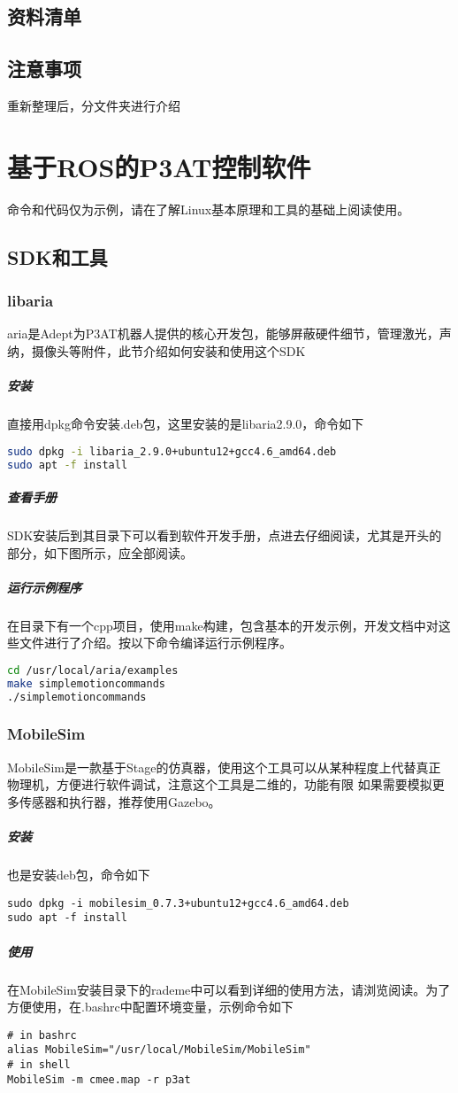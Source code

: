 \documentclass[a4paper,twoside,cs4size,fancyhdr,notitlepage]{ctexart}
\begin{document}
\subsection{资料清单}
\subsection{注意事项}
重新整理后，分文件夹进行介绍
\section{基于ROS的P3AT控制软件}
命令和代码仅为示例，请在了解Linux基本原理和工具的基础上阅读使用。
\lstset{
    language=bash %
}
\subsection{SDK和工具}
\subsubsection{libaria}
aria是Adept为P3AT机器人提供的核心开发包，能够屏蔽硬件细节，管理激光，声纳，摄像头等附件，此节介绍如何安装和使用这个SDK
\subparagraph{安装}
直接用dpkg命令安装.deb包，这里安装的是libaria2.9.0，命令如下
\begin{lstlisting}[language=bash]
sudo dpkg -i libaria_2.9.0+ubuntu12+gcc4.6_amd64.deb
sudo apt -f install
\end{lstlisting}
\subparagraph{查看手册}
SDK安装后到其目录下可以看到软件开发手册，点进去仔细阅读，尤其是开头的部分，如下图所示，应全部阅读。
\subparagraph{运行示例程序}
在目录下有一个cpp项目，使用make构建，包含基本的开发示例，开发文档中对这些文件进行了介绍。按以下命令编译运行示例程序。
\begin{lstlisting}[language=bash]
cd /usr/local/aria/examples
make simplemotioncommands
./simplemotioncommands
\end{lstlisting}
\subsubsection{MobileSim}
MobileSim是一款基于Stage的仿真器，使用这个工具可以从某种程度上代替真正物理机，方便进行软件调试，注意这个工具是二维的，功能有限
如果需要模拟更多传感器和执行器，推荐使用Gazebo。
\subparagraph{安装}
也是安装deb包，命令如下
\begin{lstlisting}
sudo dpkg -i mobilesim_0.7.3+ubuntu12+gcc4.6_amd64.deb
sudo apt -f install
\end{lstlisting}
\subparagraph{使用}
在MobileSim安装目录下的rademe中可以看到详细的使用方法，请浏览阅读。为了方便使用，在.bashrc中配置环境变量，示例命令如下
\begin{lstlisting}
# in bashrc
alias MobileSim="/usr/local/MobileSim/MobileSim"
# in shell
MobileSim -m cmee.map -r p3at
\end{lstlisting}
\end{document}
